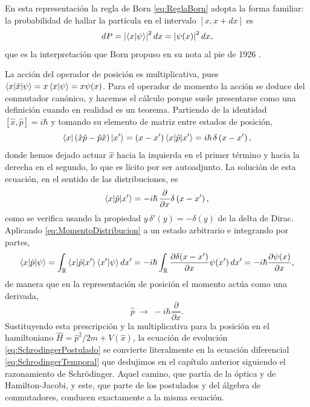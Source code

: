         En esta representación la regla de Born \eqref{eq:ReglaBorn} adopta la forma familiar: la probabilidad de hallar la partícula en el intervalo $[x,x+dx]$ es
        \begin{equation}\label{eq:BornPosicion}
            dP = \left|\braket{x|\psi}\right|^{2}dx = \left|\psi(x)\right|^{2}dx,
        \end{equation}
        que es la interpretación que Born propuso en su nota al pie de 1926 \citep{born1926stossvorgange}.

        La acción del operador de posición es multiplicativa, pues $\braket{x|\hat{x}|\psi} = x\braket{x|\psi} = x\psi(x)$. Para el operador de momento la acción se deduce del conmutador canónico, y hacemos el cálculo porque suele presentarse como una definición cuando en realidad es un teorema. Partiendo de la identidad $[\hat{x},\hat{p}] = i\hbar$ y tomando su elemento de matriz entre estados de posición,
        \begin{equation}\label{eq:ElementoConmutador}
            \braket{x|\left(\hat{x}\hat{p} - \hat{p}\hat{x}\right)|x'} = \left(x - x'\right)\braket{x|\hat{p}|x'} = i\hbar\,\delta\left(x-x'\right),
        \end{equation}
        donde hemos dejado actuar $\hat{x}$ hacia la izquierda en el primer término y hacia la derecha en el segundo, lo que es lícito por ser autoadjunto. La solución de esta ecuación, en el sentido de las distribuciones, es
        \begin{equation}\label{eq:MomentoDistribucion}
            \braket{x|\hat{p}|x'} = -i\hbar\,\frac{\partial}{\partial x}\delta\left(x-x'\right),
        \end{equation}
        como se verifica usando la propiedad $y\,\delta'(y) = -\delta(y)$ de la delta de Dirac. Aplicando \eqref{eq:MomentoDistribucion} a un estado arbitrario e integrando por partes,
        \begin{equation}\label{eq:MomentoDerivada}
            \braket{x|\hat{p}|\psi} = \int_{\mathbb{R}}\braket{x|\hat{p}|x'}\braket{x'|\psi}dx'
            = -i\hbar\int_{\mathbb{R}}\frac{\partial\delta(x-x')}{\partial x}\psi(x')\,dx'
            = -i\hbar\frac{\partial\psi(x)}{\partial x},
        \end{equation}
        de manera que en la representación de posición el momento actúa como una derivada,
        \begin{equation}\label{eq:OperadorMomento}
            \boxed{\;\hat{p} \;\longrightarrow\; -i\hbar\frac{\partial}{\partial x} .\;}
        \end{equation}
        Sustituyendo esta prescripción y la multiplicativa para la posición en el hamiltoniano $\hat{H} = \hat{p}^{2}/2m + V(\hat{x})$, la ecuación de evolución \eqref{eq:SchrodingerPostulado} se convierte literalmente en la ecuación diferencial \eqref{eq:SchrodingerTemporal} que dedujimos en el capítulo anterior siguiendo el razonamiento de Schrödinger. Aquel camino, que partía de la óptica y de Hamilton-Jacobi, y este, que parte de los postulados y del álgebra de conmutadores, conducen exactamente a la misma ecuación.

